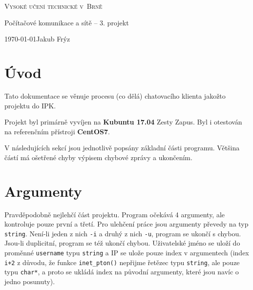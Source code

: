 \documentclass[a4paper, 11pt]{article}
\begin{document}
\begin{titlepage}
	
	\begin{center}
		
		\textsc{{\Huge Vysoké učení technické v~Brně}\\}
		
		
		{\LARGE Počítačové komunikace a sítě -- 3. projekt}\\
		
		
		
		{\Large \today \hfill Jakub Frýz}
		
	\end{center}
	
\end{titlepage}

\section*{Úvod}

Tato dokumentace se věnuje procesu (co dělá) chatovacího klienta jakožto projektu do IPK.

Projekt byl primárně vyvíjen na \textbf{Kubuntu 17.04} Zesty Zapus. Byl i otestován na referenčním přístroji \textbf{CentOS7}.

V následujících sekcí jsou jednotlivě popsány základní části programu. Většina částí má ošetřené chyby výpisem chybové zprávy a ukončením.


\section{Argumenty}

Pravděpodobně nejlehčí část projektu. Program očekává 4 argumenty, ale kontroluje pouze první a třetí. Pro ulehčení práce jsou argumenty převedy na typ \texttt{string}. Není-li jeden z nich \texttt{-i} a druhý z nich \texttt{-u}, program se ukončí s chybou. Jsou-li duplicitní, program se též ukončí chybou. Uživatelské jméno se uloží do proměnné \texttt{username} typu \texttt{string} a IP se ulože pouze index v argumentech (index \texttt{i+2} z důvodu, že funkce \texttt{inet\_pton()} nepřijme řetězec typu \texttt{string}, ale pouze typu \texttt{char*}, a proto se ukládá index na původní argumenty, které jsou navíc o jedno posunuty).
\end{document}
